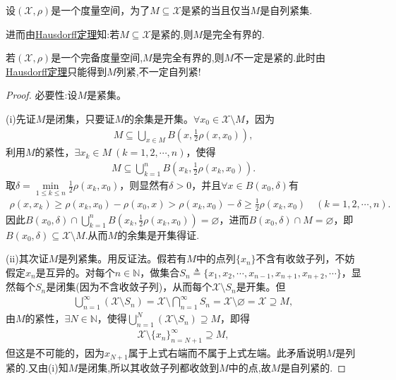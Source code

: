 \documentclass[../../main.tex]{subfiles}%
\begin{document}
\begin{theorem}\label{theorem:紧集等价于自列紧}
设$(\mathscr{X},\rho)$是一个度量空间，为了$M\subseteq\mathscr{X}$是紧的当且仅当$M$是自列紧集.

进而由\hyperref[theorem:泛函分析--Hausdorff定理]{Hausdorff定理}知:若$M\subseteq\mathscr{X}$是紧的,则$M$是完全有界的.
\end{theorem}
\begin{remark}
若$(\mathscr{X},\rho)$是一个完备度量空间,$M$是完全有界的,则$M$不一定是紧的.此时由\hyperref[theorem:泛函分析--Hausdorff定理]{Hausdorff定理}只能得到$M$列紧,不一定自列紧!
\end{remark}
\begin{proof}

{\heiti 必要性:}设$M$是紧集。

(i)先证$M$是闭集，只要证$M$的余集是开集。$\forall x_0\in\mathscr{X}\setminus M$，因为
\begin{align*}
M\subseteq\bigcup\limits_{x\in M}B\left(x,\frac{1}{2}\rho(x,x_0)\right),
\end{align*}
利用$M$的紧性，$\exists x_k\in M\ (k=1,2,\cdots,n)$，使得
\begin{align*}
M\subseteq\bigcup\limits_{k=1}^n B\left(x_k,\frac{1}{2}\rho(x_k,x_0)\right).
\end{align*}
取$\delta=\min\limits_{1\leqslant k\leqslant n}\frac{1}{2}\rho(x_k,x_0)$，则显然有$\delta>0$，并且$\forall x\in B(x_0,\delta)$有
\begin{align*}
\rho (x,x_k)\geqslant \rho (x_k,x_0)-\rho (x_0,x)>\rho (x_k,x_0)-\delta \geqslant \frac{1}{2}\rho (x_k,x_0)\quad (k=1,2,\cdots ,n).
\end{align*}
因此$B(x_0,\delta )\cap \bigcup_{k=1}^n{B\left( x_k,\frac{1}{2}\rho (x_k,x_0) \right)}=\varnothing $，进而$B(x_0,\delta)\cap M=\varnothing$，即$B(x_0,\delta)\subseteq \mathscr{X}\setminus M$.从而$M$的余集是开集得证.

(ii)其次证$M$是列紧集。用反证法。假若有$M$中的点列$\{x_n\}$不含有收敛子列，不妨假定$x_n$是互异的。对每个$n\in\mathbb{N}$，做集合$S_n\triangleq\{x_1,x_2,\cdots,x_{n-1},x_{n+1},x_{n+2},\cdots\}$，显然每个$S_n$是闭集(因为不含收敛子列)，从而每个$\mathscr{X}\setminus S_n$是开集。但
\begin{align*}
\bigcup\limits_{n=1}^\infty(\mathscr{X}\setminus S_n)=\mathscr{X}\setminus\bigcap\limits_{n=1}^\infty S_n=\mathscr{X}\setminus\varnothing=\mathscr{X}\supseteq M,
\end{align*}
由$M$的紧性，$\exists N\in\mathbb{N}$，使得$\bigcup\limits_{n=1}^N(\mathscr{X}\setminus S_n)\supseteq M$，即得
\begin{align*}
\mathscr{X}\setminus\{x_n\}_{n=N+1}^\infty\supseteq M,
\end{align*}
但这是不可能的，因为$x_{N+1}$属于上式右端而不属于上式左端。此矛盾说明$M$是列紧的.又由(i)知$M$是闭集,所以其收敛子列都收敛到$M$中的点,故$M$是自列紧的.


\end{proof}
\end{document}
